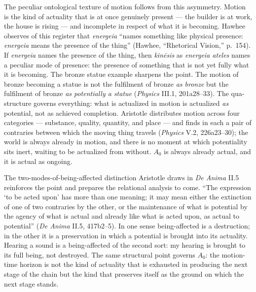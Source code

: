 The peculiar ontological texture of motion follows from this asymmetry. Motion is the kind of actuality that is at once genuinely present --- the builder is at work, the house is rising --- and incomplete in respect of what it is becoming. Hawhee observes of this register that \textit{energeia} ``names something like physical presence: \textit{energeia} means the presence of the thing'' (Hawhee, ``Rhetorical Vision,'' p.~154). If \textit{energeia} names the presence of the thing, then \textit{kinēsis} as \textit{energeia ateles} names a peculiar mode of presence: the presence of something that is not yet fully what it is becoming. The bronze statue example sharpens the point. The motion of bronze becoming a statue is not the fulfilment of bronze \textit{as bronze} but the fulfilment of bronze \textit{as potentially a statue} (\textit{Physics} III.1, 201a28--33). The qua-structure governs everything: what is actualized in motion is actualized \textit{as} potential, not as achieved completion. Aristotle distributes motion across four categories --- substance, quality, quantity, and place --- and finds in each a pair of contraries between which the moving thing travels (\textit{Physics} V.2, 226a23--30); the world is always already in motion, and there is no moment at which potentiality sits inert, waiting to be actualized from without. $A_0$ is always already actual, and it is actual as ongoing.

The two-modes-of-being-affected distinction Aristotle draws in \textit{De Anima} II.5 reinforces the point and prepares the relational analysis to come. ``The expression `to be acted upon' has more than one meaning; it may mean either the extinction of one of two contraries by the other, or the maintenance of what is potential by the agency of what is actual and already like what is acted upon, as actual to potential'' (\textit{De Anima} II.5, 417b2--5). In one sense being-affected is a destruction; in the other it is a preservation in which a potential is brought into its actuality. Hearing a sound is a being-affected of the second sort: my hearing is brought to its full being, not destroyed. The same structural point governs $A_0$: the motion-time horizon is not the kind of actuality that is exhausted in producing the next stage of the chain but the kind that preserves itself as the ground on which the next stage stands.

